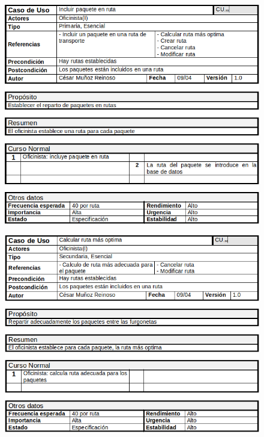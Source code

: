 \begin{figure}[H]
	\centering
	\includegraphics[width=16cm]{33}
\end{figure}
\begin{figure}[H]
	\centering
	\includegraphics[width=16cm]{34}
\end{figure}
